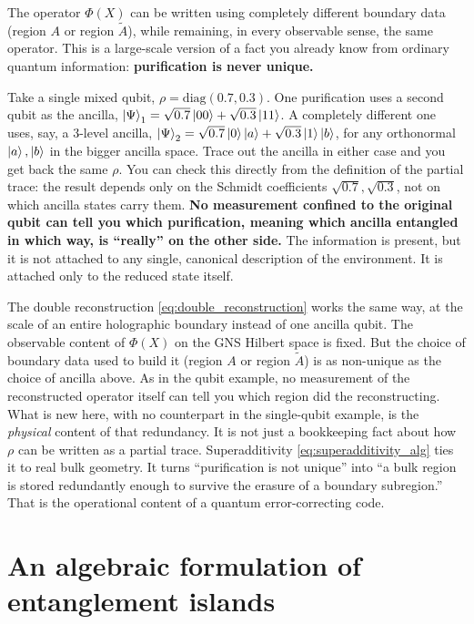 \begin{physconnect}
The operator $\Phi(X)$ can be written using completely different boundary data (region $A$ or region
$\widetilde A$), while remaining, in every observable sense, the same operator. This is a large-scale version
of a fact you already know from ordinary quantum information: \textbf{purification is never unique.}

Take a single mixed qubit, $\rho=\mathrm{diag}(0.7,0.3)$. One purification uses a second qubit as the
ancilla, $\ket\Psi_1=\sqrt{0.7}\ket{00}+\sqrt{0.3}\ket{11}$. A completely different one uses, say, a 3-level
ancilla, $\ket\Psi_2=\sqrt{0.7}\ket{0}\ket{a}+\sqrt{0.3}\ket{1}\ket{b}$, for any orthonormal $\ket a,\ket b$ in
the bigger ancilla space. Trace out the ancilla in either case and you get back the same $\rho$. You can check
this directly from the definition of the partial trace: the result depends only on the Schmidt coefficients
$\sqrt{0.7},\sqrt{0.3}$, not on which ancilla states carry them. \textbf{No measurement confined to the
original qubit can tell you which purification, meaning which ancilla entangled in which way, is ``really''
on the other side.} The information is present, but it is not attached to any single, canonical description of
the environment. It is attached only to the reduced state itself.

The double reconstruction \eqref{eq:double_reconstruction} works the same way, at the scale of an entire
holographic boundary instead of one ancilla qubit. The observable content of $\Phi(X)$ on the GNS Hilbert space
is fixed. But the choice of boundary data used to build it (region $A$ or region $\widetilde A$) is as
non-unique as the choice of ancilla above. As in the qubit example, no measurement of the reconstructed
operator itself can tell you which region did the reconstructing. What is new here, with no counterpart in the
single-qubit example, is the \emph{physical} content of that redundancy. It is not just a bookkeeping fact about
how $\rho$ can be written as a partial trace. Superadditivity \eqref{eq:superadditivity_alg} ties it to real
bulk geometry. It turns ``purification is not unique'' into ``a bulk region is stored redundantly enough to
survive the erasure of a boundary subregion.'' That is the operational content of a quantum error-correcting
code.
\end{physconnect}

\section{An algebraic formulation of entanglement islands}

